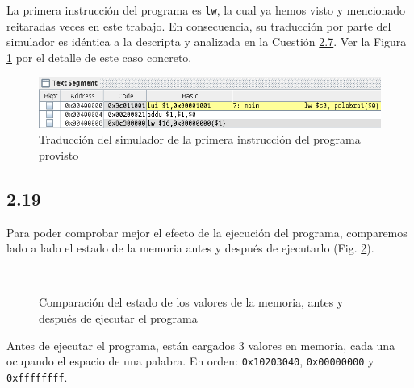 \documentclass[a4paper]{report}
\begin{document}
La primera instrucción del programa es \texttt{lw}, la cual ya hemos visto y mencionado reitaradas veces en este trabajo. En consecuencia, su traducción por parte del simulador es idéntica a la descripta y analizada en la Cuestión \hyperref[sec:c2-7]{2.7}. Ver la Figura \ref{fig:c2-18} por el detalle de este caso concreto.

\begin{figure}[H]
    \centering
    \captionsetup{justification = centering}
    \includegraphics[width=.9\linewidth]{img/c2-18}
    \caption{Traducción del simulador de la primera instrucción del programa provisto}
    \label{fig:c2-18}
\end{figure}

\subsection*{2.19}

Para poder comprobar mejor el efecto de la ejecución del programa, comparemos lado a lado el estado de la memoria antes y después de ejecutarlo (Fig. \ref{fig:side-by-side-2-19}).

\begin{figure}[H]
    \centering
    \captionsetup{justification = centering}
    \\
    \caption{Comparación del estado de los valores de la memoria, antes y después de ejecutar el programa}
    \label{fig:side-by-side-2-19}
\end{figure}

Antes de ejecutar el programa, están cargados 3 valores en memoria, cada una ocupando el espacio de una palabra. En orden: \texttt{0x10203040}, \texttt{0x00000000} y \texttt{0xffffffff}.
\end{document}
